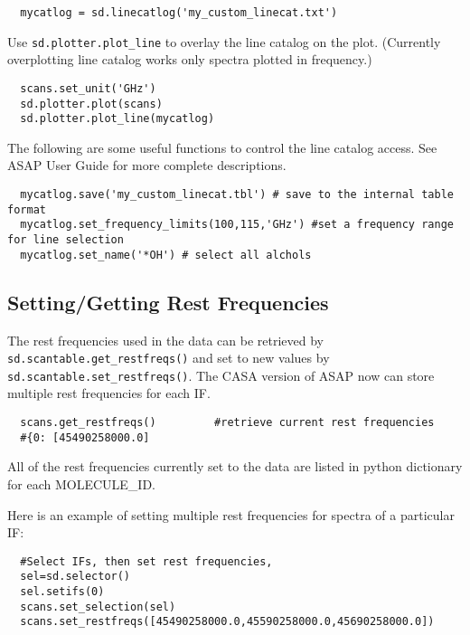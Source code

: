 \small
\begin{verbatim}
  mycatlog = sd.linecatlog('my_custom_linecat.txt')
\end{verbatim}
\normalsize

Use {\tt sd.plotter.plot\_line} to overlay the line catalog on 
the plot. (Currently overplotting line catalog works only spectra plotted
in frequency.)

\small
\begin{verbatim}
  scans.set_unit('GHz')
  sd.plotter.plot(scans)
  sd.plotter.plot_line(mycatlog)
\end{verbatim}
\normalsize

The following are some useful functions to control the line catalog
access. See ASAP User Guide for more complete descriptions.

\small
\begin{verbatim}
  mycatlog.save('my_custom_linecat.tbl') # save to the internal table format
  mycatlog.set_frequency_limits(100,115,'GHz') #set a frequency range for line selection
  mycatlog.set_name('*OH') # select all alchols
\end{verbatim}
\normalsize


\subsection{Setting/Getting Rest Frequencies}
\label{subsection:sd.asap.restfreqs}

The rest frequencies used in the data can be retrieved by 
{\tt sd.scantable.get\_restfreqs()} and set to new values by 
{\tt sd.scantable.set\_restfreqs()}.
The CASA version of ASAP now can store multiple rest frequencies 
for each IF.

\small
\begin{verbatim}
  scans.get_restfreqs()         #retrieve current rest frequencies
  #{0: [45490258000.0]
\end{verbatim}
All of the rest frequencies currently set to the data are listed in
python dictionary for each MOLECULE\_ID.

Here is an example of setting multiple rest frequencies for spectra of a particular IF:
\begin{verbatim}
  #Select IFs, then set rest frequencies,
  sel=sd.selector()
  sel.setifs(0)
  scans.set_selection(sel)
  scans.set_restfreqs([45490258000.0,45590258000.0,45690258000.0])
\end{verbatim}

